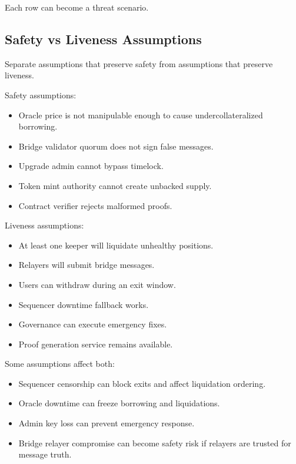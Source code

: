 Each row can become a threat scenario.

\subsection{Safety vs Liveness Assumptions}

Separate assumptions that preserve safety from assumptions that preserve
liveness.

Safety assumptions:

\begin{itemize}
\tightlist
\item
  Oracle price is not manipulable enough to cause undercollateralized
  borrowing.
\item
  Bridge validator quorum does not sign false messages.
\item
  Upgrade admin cannot bypass timelock.
\item
  Token mint authority cannot create unbacked supply.
\item
  Contract verifier rejects malformed proofs.
\end{itemize}

Liveness assumptions:

\begin{itemize}
\tightlist
\item
  At least one keeper will liquidate unhealthy positions.
\item
  Relayers will submit bridge messages.
\item
  Users can withdraw during an exit window.
\item
  Sequencer downtime fallback works.
\item
  Governance can execute emergency fixes.
\item
  Proof generation service remains available.
\end{itemize}

Some assumptions affect both:

\begin{itemize}
\tightlist
\item
  Sequencer censorship can block exits and affect liquidation ordering.
\item
  Oracle downtime can freeze borrowing and liquidations.
\item
  Admin key loss can prevent emergency response.
\item
  Bridge relayer compromise can become safety risk if relayers are
  trusted for message truth.
\end{itemize}

